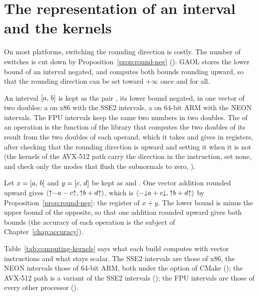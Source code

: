 \section{The representation of an interval and the kernels}
\label{sec:kernels}
%
%

On most platforms, switching the rounding direction is costly. The number of
switches is cut down by Proposition~\ref{prop:round-neg}
(): GAOL stores the lower bound of an interval negated,
and computes both bounds rounding upward, so that the rounding direction can be
set toward $+\infty$ once and for all.

\begin{Def}\label{def:computing-register}
An interval $[a,\,b]$ is kept as the pair , its lower
bound negated, in one vector of two doubles: a  on x86 with
the SSE2 intervals, a  on 64-bit ARM with the NEON
intervals. The FPU intervals keep the same two numbers in two doubles. The
 of an operation is the function of the library that computes
the two doubles of its result from the two doubles of each operand, which it
takes and gives in registers, after checking that the rounding direction is
upward and setting it when it is not (the kernels of the AVX-512 path carry
the direction in the instruction, set none, and check only the modes that flush the subnormals to zero, ).
\end{Def}

\begin{Ex}
Let $x = [a,\,b]$ and $y = [c,\,d]$ be kept as  and
. One vector addition rounded upward gives
$\langle \mathopen{\uparrow}-a-c\mathclose{\uparrow}, \mathopen{\uparrow}b+d\mathclose{\uparrow} \rangle$, which is
$\langle -\mathopen{\downarrow}a+c\mathclose{\downarrow}, \mathopen{\uparrow}b+d\mathclose{\uparrow} \rangle$ by
Proposition~\ref{prop:round-neg}: the register of $x+y$. The lower
bound is minus the upper bound of the opposite, so that one addition rounded
upward gives both bounds (the accuracy of each operation is the subject of
Chapter~\ref{chap:accuracy}).
\end{Ex}

\medskip
Table~\ref{tab:computing-kernels} says what each build computes with vector
instructions and what stays scalar. The SSE2 intervals are those of x86, the
NEON intervals those of 64-bit ARM, both under the option 
of CMake (); the AVX-512 path is a variant of the SSE2
intervals (); the FPU intervals are those of every other
processor ().

